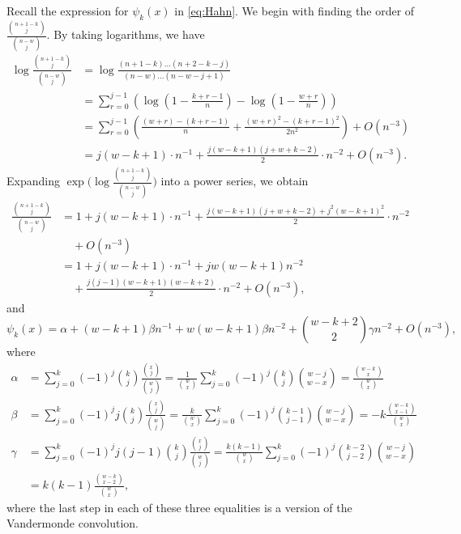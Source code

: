 \documentclass{amsart}
\begin{document}
Recall the expression for $\psi_k(x)$ in \eqref{eq:Hahn}.
We begin with finding the order of $\frac{\binom{n+1-k}{j}}{\binom{n-w}{j}}$. By taking logarithms, we have
\begin{align*}
    \log\frac{\binom{n+1-k}{j}}{\binom{n-w}{j}} &= \log\frac{(n+1-k) \dots (n+2-k-j)}{(n-w) \dots (n-w-j+1)} \\
    &= \sum_{r=0}^{j-1} \left(\log\left(1-\frac{k+r-1}{n}\right) - \log\left(1-\frac{w+r}{n}\right)\right) \\
    &= \sum_{r=0}^{j-1}\left( \frac{(w+r) - (k+r-1)}{n} + \frac{(w+r)^2 - (k+r-1)^2}{2n^2}\right) + O(n^{-3}) \\
    &= j(w-k+1) \cdot n^{-1} + \frac{j(w-k+1)(j+w+k-2)}{2} \cdot n^{-2} + O(n^{-3}).
\end{align*}
Expanding $\exp\Big({\log\frac{\binom{n+1-k}{j}}{\binom{n-w}{j}}}\Big)$ into a power series, we obtain
\begin{align*}
    \frac{\binom{n+1-k}{j}}{\binom{n-w}{j}} &= 1 + j(w-k+1) \cdot n^{-1} + \frac{j(w-k+1)(j+w+k-2) + j^2(w-k+1)^2}{2} \cdot n^{-2}\\
    &\quad + O(n^{-3}) \\
    &= 1 + j(w-k+1) \cdot n^{-1} + jw(w-k+1)n^{-2} \\
    &\quad + \frac{j(j-1)(w-k+1)(w-k+2)}{2} \cdot n^{-2} + O(n^{-3}),
\end{align*}
and
\begin{equation}
    \psi_k(x) = \alpha + (w-k+1)\beta n^{-1} + w(w-k+1)\beta n^{-2} + \binom{w-k+2}{2}\gamma n^{-2} + O(n^{-3}),
\end{equation}
where
   \begin{align*}
   \alpha&=\sum_{j=0}^{k} (-1)^j \binom{k}{j}\frac{\binom{x}{j}}{\binom{w}{j}}=
   \frac1{\binom wx}\sum_{j=0}^{k} (-1)^j \binom kj\binom{w-j}{w-x}=\frac{\binom{w-k}{x}}{\binom{w}{x}}\\
   \beta&=\sum_{j=0}^{k} (-1)^j j\binom{k}{j}\frac{\binom{x}{j}}{\binom{w}{j}}=
     \frac k{\binom wx} \sum_{j=0}^{k} (-1)^j \binom{k-1}{j-1}\binom{w-j}{w-x}=-k\frac{\binom{w-k}{x-1}}{\binom{w}{x}}\\
   \gamma&= \sum_{j=0}^{k} (-1)^j j(j-1)\binom{k}{j}\frac{\binom{x}{j}}{\binom{w}{j}}=
     \frac {k(k-1)}{\binom wx} \sum_{j=0}^{k} (-1)^j \binom{k-2}{j-2}\binom{w-j}{w-x}\\
      &=k(k-1)\frac{\binom{w-k}{x-2}}{\binom{w}{x}},
  \end{align*}
where the last step in each of these three equalities is a version of the Vandermonde convolution.
\end{document}
